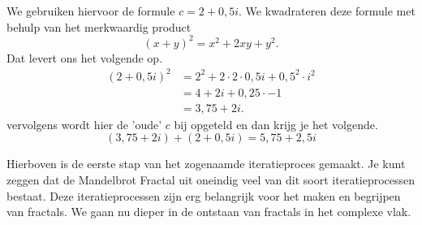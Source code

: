 \documentclass[11pt,fleqn]{book} %
\begin{document}
We gebruiken hiervoor de formule $c=2+0,5i$. We kwadrateren deze formule met behulp van het merkwaardig product
\begin{displaymath}
{\left(x+y\right)}^2=x^2+2xy+y^2.
\end{displaymath}
Dat levert ons het volgende op.
\begin{align*}
{\left(2+0,5i\right)}^2 &= 2^2+2\cdot 2\cdot 0,5i+0,5^2\cdot i^2\\
&= 4+2i+0,25\cdot -1\\
&= 3,75+2i.
\end{align*}
vervolgens wordt hier de 'oude' $c$ bij opgeteld en dan krijg je het volgende.
\begin{displaymath}
(3,75+2i)+(2+0,5i)=5,75+2,5i
\end{displaymath}

Hierboven is de eerste stap van het zogenaamde iteratieproces gemaakt. Je kunt zeggen dat de Mandelbrot Fractal uit oneindig veel van dit soort iteratieprocessen bestaat. Deze iteratieprocessen zijn erg belangrijk voor het maken en begrijpen van fractals. We gaan nu dieper in de ontstaan van fractals in het complexe vlak.    
\end{document}
